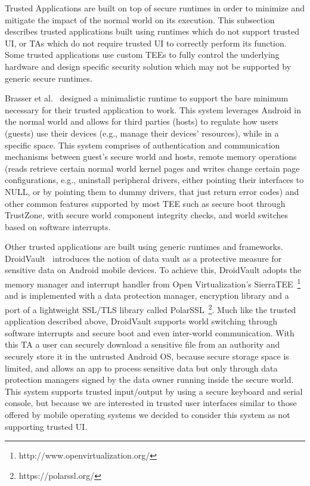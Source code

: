 Trusted Applications are built on top of secure runtimes in order to minimize and mitigate the impact of the normal world on its execution. This subsection describes trusted applications built using runtimes which do not support trusted UI, or TAs which do not require trusted UI to correctly perform its function. Some trusted applications use custom TEEs to fully control the underlying hardware and design specific security solution which may not be supported by generic secure runtimes. 

Brasser et al.~\cite{brasserregulating} designed a minimalistic runtime to support the bare minimum necessary for their trusted application to work. This system leverages Android in the normal world and allows for third parties (hosts) to regulate how users (guests) use their devices (e.g., manage their devices’ resources), while in a specific space. This system comprises of authentication and communication mechanisms between guest's secure world and hosts, remote memory operations (reads retrieve certain normal world kernel pages and writes change certain page configurations, e.g., uninstall peripheral drivers, either pointing their interfaces to NULL, or by pointing them to dummy drivers, that just return error codes) and other common features supported by most TEE such as secure boot through TrustZone, with secure world component integrity checks, and world switches based on software interrupts. %

Other trusted applications are built using generic runtimes and frameworks. DroidVault~\cite{li2014droidvault} introduces the notion of data vault as a protective measure for sensitive data on Android mobile devices. To achieve this, DroidVault adopts the memory manager and interrupt handler from Open Virtualization's SierraTEE~\footnote{http://www.openvirtualization.org/} and is implemented with a data protection manager, encryption library and a port of a lightweight SSL/TLS library called PolarSSL~\footnote{https://polarssl.org/}. Much like the trusted application described above, DroidVault supports world switching through software interrupts and secure boot and even inter-world communication. With this TA a user can securely download a sensitive file from an authority and securely store it in the untrusted Android OS, because secure storage space is limited, and allows an app to process sensitive data but only through data protection managers signed by the data owner running inside the secure world. This system supports trusted input/output by using a secure keyboard and serial console, but because we are interested in trusted user interfaces similar to those offered by mobile operating systems we decided to consider this system as not supporting trusted UI. 

